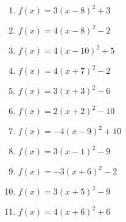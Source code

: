 \documentclass{article}%
\begin{document}
\begin{enumerate}[label=\alph*)]
\item%
\newline\vspace{0.5cm} $f(x)=3(x-8)^2 +3$%
\item%
\newline\vspace{0.5cm} $f(x)=4(x-8)^2 -2$%
\item%
\newline\vspace{0.5cm} $f(x)=4(x-10)^2 +5$%
\item%
\newline\vspace{0.5cm} $f(x)=4(x+7)^2 -2$%
\item%
\newline\vspace{0.5cm} $f(x)=3(x+3)^2 -6$%
\item%
\newline\vspace{0.5cm} $f(x)=2(x+2)^2 -10$%
\item%
\newline\vspace{0.5cm} $f(x)=-4(x-9)^2 +10$%
\item%
\newline\vspace{0.5cm} $f(x)=3(x-1)^2 -9$%
\item%
\newline\vspace{0.5cm} $f(x)=-3(x+6)^2 -2$%
\item%
\newline\vspace{0.5cm} $f(x)=3(x+5)^2 -9$%
\item%
\newline\vspace{0.5cm} $f(x)=4(x+6)^2 +6$%
\end{enumerate}

%
\end{document}
